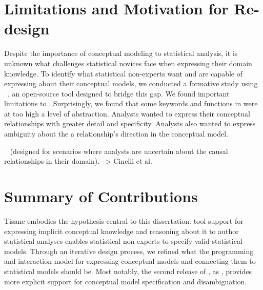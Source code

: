 \section{Limitations and Motivation for Re-design}
Despite the importance of conceptual modeling to statistical analysis, it is
unknown what challenges statistical novices face when expressing their domain
knowledge. To identify what statistical non-experts want and are capable of
expressing about their conceptual models, we conducted a formative study using
\tisane~\cite{jun2022tisane}, an open-source tool designed to bridge this gap.
We found important limitations to \tisane. Surprisingly, we found that some
keywords and functions in \tisane were at too high a level of abstraction.
Analysts wanted to express their conceptual relationships with greater detail
and specificity. Analysts also wanted to express ambiguity about the a
relationship's direction in the conceptual model. 


~\cite{vanderweele2019modifiedDisjunctiveCriterion} (designed for
scenarios where analysts are uncertain about the causal relationships in their
domain).  --> Cinelli et al. 







\section{Summary of Contributions}


Tisane embodies the hypothesis central to this dissertation: tool support for
expressing implicit conceptual knowledge and reasoning about it to author
statistical analyses enables statistical non-experts to specify valid
statistical models. Through an iterative design process, we refined what the
programming and interaction model for expressing conceptual models and
connecting them to statistical models should be. Most notably, the second
release of \tisane, as \rTisane, provides more explicit support for conceptual
model specification and disambiguation. 

